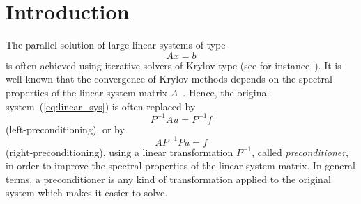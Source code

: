 % 
% 
% 
%  
%  
% 

\section{Introduction}
\label{chap:introduction}

The parallel solution of large linear systems of type
\begin{equation}
\label{eq:linear_sys}
A {x} = {b}
\end{equation}
is often achieved using iterative solvers of Krylov type (see for
instance~\cite{barret93templates}).
It is well known that the convergence of Krylov methods depends on 
the spectral properties of the linear system matrix
$A$~\cite{axelsson94iterative,saad96iterative,QSS}. Hence, the
original system~(\ref{eq:linear_sys}) is often replaced by
\[
P^{-1} A{u} = P^{-1} {f}
\]
(left-preconditioning), or by
\[
A P^{-1} P {u} = {f}
\]
(right-preconditioning), using a linear transformation $P^{-1}$,
called {\sl preconditioner}, in order to improve the spectral properties of
the linear system matrix. In general terms, a preconditioner is any
kind of transformation applied to the original system which makes it
easier to solve.

